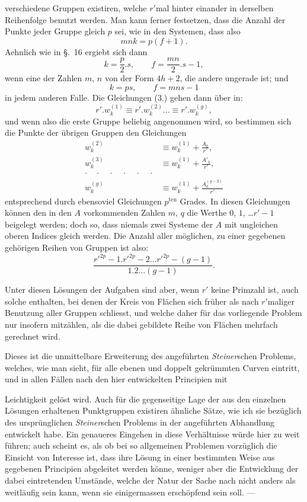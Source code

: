 \documentclass{article}
\begin{document}
verschiedene Gruppen existiren, welche $r'$mal hinter einander in derselben Reihenfolge benutzt werden. Man kann ferner festsetzen, dass die Anzahl der Punkte jeder Gruppe gleich $p$ sei, wie in den Systemen, dass also
\[ mnk = p(f+1). \]
Aehnlich wie in §.~16 ergiebt sich dann
\[ k=\frac{p}{2}.s, \qquad f=\frac{mn}{2}.s-1, \]
wenn eine der Zahlen $m$, $n$ von der Form $4h+2$, die andere ungerade ist; und
\[ k=ps, \qquad f=mns-1 \]
in jedem anderen Falle. Die Gleichungen (3.) gehen dann über in:
\[ r'.w_{k}^{(1)} \equiv r'.w_{k}^{(2)} \ldots \equiv r'.w_{k}^{(g)}, \]
und wenn also die erste Gruppe beliebig angenommen wird, so bestimmen sich die Punkte der übrigen Gruppen den Gleichungen
\[ \begin{aligned}
w_{k}^{(2)} &\equiv w_{k}^{(1)}+\frac{A_{k}}{r'}, \\
w_{k}^{(3)} &\equiv w_{k}^{(1)}+\frac{A'_{k}}{r'}, \\
\cdot\quad\cdot\quad\cdot\quad\cdot\quad\cdot\quad\cdot & \\
w_{k}^{(g)} &\equiv w_{k}^{(1)}+\frac{A_{k}^{(g-2)}}{r'}
\end{aligned} \]
entsprechend durch ebensoviel Gleichungen $p^{\text{ten}}$ Grades. In diesen Gleichungen können den in den $A$ vorkommenden Zahlen $m$, $q$ die Werthe $0$, $1$, \ldots $r'-1$ beigelegt werden; doch so, dass niemals zwei Systeme der $A$ mit ungleichen oberen Indices gleich werden. Die Anzahl aller möglichen, zu einer gegebenen gehörigen Reihen von Gruppen ist also:
\[ \frac{{r'}^{2p}-1.{r'}^{2p}-2\ldots{r'}^{2p}-(g-1)}{1.2\ldots(g-1)}. \]

Unter diesen Lösungen der Aufgaben sind aber, wenn $r'$ keine Primzahl ist, auch solche enthalten, bei denen der Kreis von Flächen sich früher als nach $r'$maliger Benutzung aller Gruppen schliesst, und welche daher für das vorliegende Problem nur insofern mitzählen, als die dabei gebildete Reihe von Flächen mehrfach gerechnet wird.

Dieses ist die unmittelbare Erweiterung des angeführten \emph{Steiner}schen Problems, welches, wie man sieht, für alle ebenen und doppelt gekrümmten Curven eintritt, und in allen Fällen nach den hier entwickelten Principien mit

Leichtigkeit gelöst wird. Auch für die gegenseitige Lage der aus den einzelnen Lösungen erhaltenen Punktgruppen existiren ähnliche Sätze, wie ich sie bezüglich des ursprünglichen \emph{Steiner}schen Problems in der angeführten Abhandlung entwickelt habe. Ein genaueres Eingehen in diese Verhältnisse würde hier zu weit führen; auch scheint es, als ob bei so allgemeinen Problemen vorzüglich die Einsicht von Interesse ist, dass ihre Lösung in einer bestimmten Weise aus gegebenen Principien abgeleitet werden könne, weniger aber die Entwicklung der dabei eintretenden Umstände, welche der Natur der Sache nach nicht anders als weitläufig sein kann, wenn sie einigermassen erschöpfend sein soll. ---
\end{document}
